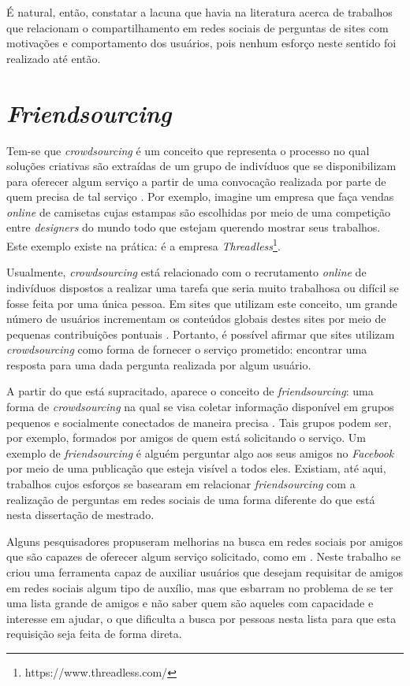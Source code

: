 É natural, então, constatar a lacuna que havia na literatura acerca de trabalhos que relacionam o compartilhamento em redes sociais de perguntas de sites \qa com motivações e comportamento dos usuários, pois nenhum esforço neste sentido foi realizado até então.

\section{\textit{Friendsourcing}}
Tem-se que \textit{crowdsourcing} é um conceito que representa o processo no qual soluções criativas são extraídas de um grupo de indivíduos que se disponibilizam para oferecer algum serviço a partir de uma convocação realizada por parte de quem precisa de tal serviço \cite{brabham2008crowdsourcing}. Por exemplo, imagine um empresa que faça vendas \textit{online} de camisetas cujas estampas são escolhidas por meio de uma competição entre \textit{designers} do mundo todo que estejam querendo mostrar seus trabalhos. Este exemplo existe na prática: é a empresa \textit{Threadless}\footnote{https://www.threadless.com/}.

Usualmente, \textit{crowdsourcing} está relacionado com o recrutamento \textit{online} de indivíduos dispostos a realizar uma tarefa que seria muito trabalhosa ou difícil se fosse feita por uma única pessoa. Em sites que utilizam este conceito, um grande número de usuários incrementam os conteúdos globais destes sites por meio de pequenas contribuições pontuais \cite{Bernstein:2008:PVF:1746259.1746260}. Portanto, é possível afirmar que sites \qa utilizam \textit{crowdsourcing} como forma de fornecer o serviço prometido: encontrar uma resposta para uma dada pergunta realizada por algum usuário.

A partir do que está supracitado, aparece o conceito de \textit{friendsourcing}: uma forma de \textit{crowdsourcing} na qual se visa coletar informação disponível em grupos pequenos e socialmente conectados de maneira precisa \cite{Bernstein:2008:PVF:1746259.1746260}. Tais grupos podem ser, por exemplo, formados por amigos de quem está solicitando o serviço. Um exemplo de \textit{friendsourcing} é alguém perguntar algo aos seus amigos no \textit{Facebook} por meio de uma publicação que esteja visível a todos eles. Existiam, até aqui, trabalhos cujos esforços se basearam em relacionar \textit{friendsourcing} com a realização de perguntas em redes sociais de uma forma diferente do que está nesta dissertação de mestrado. 

Alguns pesquisadores propuseram melhorias na busca em redes sociais por amigos que são capazes de oferecer algum serviço solicitado, como em \cite{Savage:2012:DSQ:2380296.2380321}. Neste trabalho se criou uma ferramenta capaz de auxiliar usuários que desejam requisitar de amigos em redes sociais algum tipo de auxílio, mas que esbarram no problema de se ter uma lista grande de amigos e não saber quem são aqueles com capacidade e interesse em ajudar, o que dificulta a busca por pessoas nesta lista para que esta requisição seja feita de forma direta.

